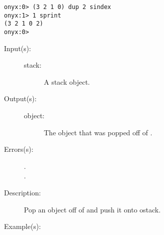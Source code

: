 \begin{description}
\begin{description}
\begin{verbatim}
onyx:0> (3 2 1 0) dup 2 sindex
onyx:1> 1 sprint
(3 2 1 0 2)
onyx:0>
		\end{verbatim}
	\end{description}
\label{systemdict:spop}
\item[{\onyxop{stack}{spop}{object}}: ]
	\begin{description}\item[]
	\item[Input(s): ]
		\begin{description}\item[]
		\item[stack: ]
			A stack object.
		\end{description}
	\item[Output(s): ]
		\begin{description}\item[]
		\item[object: ]
			The object that was popped off of .
		\end{description}
	\item[Errors(s): ]
		\begin{description}\item[]
		\item[.]
		\item[.]
		\end{description}
	\item[Description: ]
		Pop an object off of  and push it onto ostack.
	\item[Example(s): ]\begin{verbatim}


\end{verbatim}
\end{description}
\end{description}
